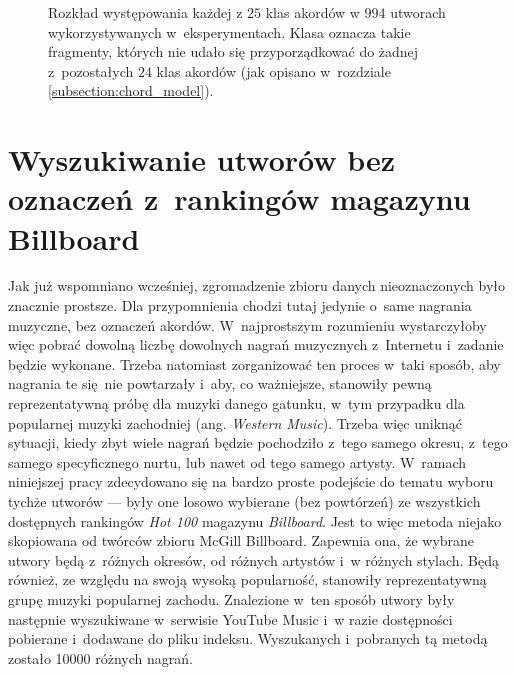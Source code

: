 \begin{figure}
    \centering
    \caption{Rozkład występowania każdej z $25$ klas akordów w $994$ utworach wykorzystywanych w~eksperymentach. Klasa  oznacza takie fragmenty, których nie udało się przyporządkować do żadnej z~pozostałych $24$ klas akordów (jak opisano w~rozdziale \ref{subsection:chord_model}).}
    \label{fig:chords_histogram}
\end{figure}


\section{Wyszukiwanie utworów bez oznaczeń z~rankingów magazynu Billboard}

Jak już wspomniano wcześniej, zgromadzenie zbioru danych nieoznaczonych było znacznie prostsze. Dla przypomnienia chodzi tutaj jedynie o~same nagrania muzyczne, bez oznaczeń akordów. W~najprostszym rozumieniu wystarczyłoby więc pobrać dowolną liczbę dowolnych nagrań muzycznych z~Internetu i~zadanie będzie wykonane. Trzeba natomiast zorganizować ten proces w~taki sposób, aby nagrania te się nie powtarzały i~aby, co ważniejsze, stanowiły pewną reprezentatywną próbę dla muzyki danego gatunku, w~tym przypadku dla popularnej muzyki zachodniej (ang. \emph{Western Music}). Trzeba więc uniknąć sytuacji, kiedy zbyt wiele nagrań będzie pochodziło z~tego samego okresu, z~tego samego specyficznego nurtu, lub nawet od tego samego artysty. W~ramach niniejszej pracy zdecydowano się na bardzo proste podejście do tematu wyboru tychże utworów --- były one losowo wybierane (bez powtórzeń) ze wszystkich dostępnych rankingów \emph{Hot 100} magazynu \emph{Billboard}. Jest to więc metoda niejako skopiowana od twórców zbioru McGill Billboard. Zapewnia ona, że wybrane utwory będą z~różnych okresów, od różnych artystów i~w różnych stylach. Będą również, ze względu na swoją wysoką popularność, stanowiły reprezentatywną grupę muzyki popularnej zachodu. Znalezione w~ten sposób utwory były następnie wyszukiwane w~serwisie YouTube Music i~w razie dostępności pobierane i~dodawane do pliku indeksu. Wyszukanych i~pobranych tą metodą zostało 10000 różnych nagrań.

